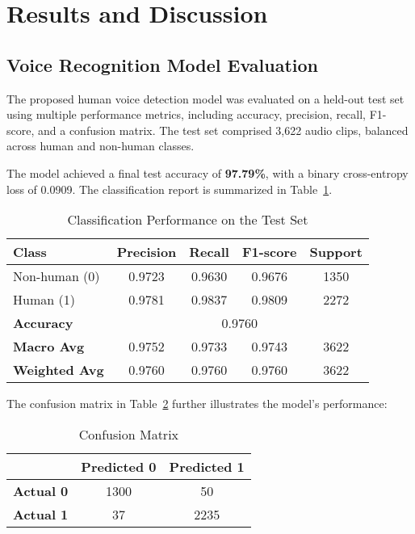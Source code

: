 \section{Results and Discussion}

\subsection{Voice Recognition Model Evaluation}
The proposed human voice detection model was evaluated on a held-out test set using multiple performance metrics, including accuracy, precision, recall, F1-score, and a confusion matrix. The test set comprised 3,622 audio clips, balanced across human and non-human classes.

The model achieved a final test accuracy of \textbf{97.79\%}, with a binary cross-entropy loss of 0.0909. The classification report is summarized in Table~\ref{tab:classification}.

\begin{table}[h]
\centering
\caption{Classification Performance on the Test Set}
\label{tab:classification}
\begin{tabular}{lcccc}
\toprule
\textbf{Class} & \textbf{Precision} & \textbf{Recall} & \textbf{F1-score} & \textbf{Support} \\
\midrule
Non-human (0) & 0.9723 & 0.9630 & 0.9676 & 1350 \\
Human (1)     & 0.9781 & 0.9837 & 0.9809 & 2272 \\
\midrule
\textbf{Accuracy} & \multicolumn{4}{c}{0.9760} \\
\textbf{Macro Avg} & 0.9752 & 0.9733 & 0.9743 & 3622 \\
\textbf{Weighted Avg} & 0.9760 & 0.9760 & 0.9760 & 3622 \\
\bottomrule
\end{tabular}
\end{table}

The confusion matrix in Table~\ref{tab:confusion} further illustrates the model’s performance:

\begin{table}[h]
\centering
\caption{Confusion Matrix}
\label{tab:confusion}
\begin{tabular}{ccc}
\toprule
 & \textbf{Predicted 0} & \textbf{Predicted 1} \\
\midrule
\textbf{Actual 0} & 1300 & 50 \\
\textbf{Actual 1} & 37 & 2235 \\
\bottomrule
\end{tabular}
\end{table}

